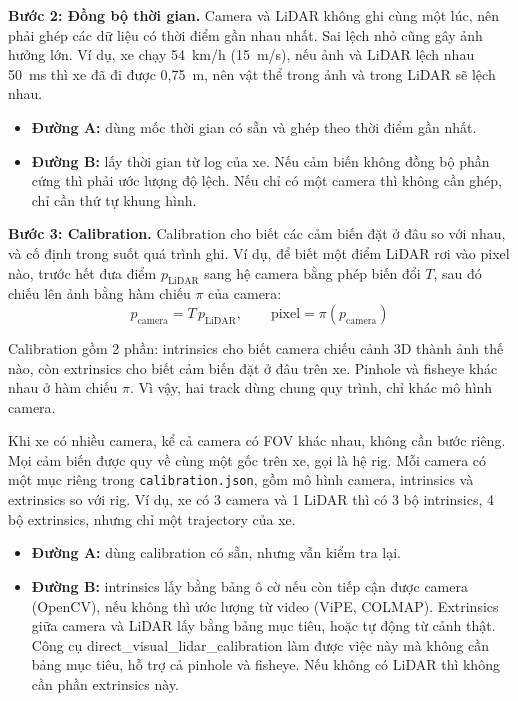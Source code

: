 \textbf{Bước 2: Đồng bộ thời gian.}
Camera và LiDAR không ghi cùng một lúc, nên phải ghép các dữ liệu có thời điểm gần nhau nhất.
Sai lệch nhỏ cũng gây ảnh hưởng lớn.
Ví dụ, xe chạy 54~km/h (15~m/s), nếu ảnh và LiDAR lệch nhau 50~ms thì xe đã đi được 0,75~m, nên vật thể trong ảnh và trong LiDAR sẽ lệch nhau.
\begin{itemize}
  \item \textbf{Đường A:} dùng mốc thời gian có sẵn và ghép theo thời điểm gần nhất.
  \item \textbf{Đường B:} lấy thời gian từ log của xe. Nếu cảm biến không đồng bộ phần cứng thì phải ước lượng độ lệch. Nếu chỉ có một camera thì không cần ghép, chỉ cần thứ tự khung hình.
\end{itemize}

\textbf{Bước 3: Calibration.}
Calibration cho biết các cảm biến đặt ở đâu so với nhau, và cố định trong suốt quá trình ghi.
Ví dụ, để biết một điểm LiDAR rơi vào pixel nào, trước hết đưa điểm $p_{\text{LiDAR}}$ sang hệ camera bằng phép biến đổi $T$, sau đó chiếu lên ảnh bằng hàm chiếu $\pi$ của camera:
\begin{equation}
  p_{\text{camera}} = T \, p_{\text{LiDAR}}, \qquad \text{pixel} = \pi(p_{\text{camera}})
\end{equation}

Calibration gồm 2 phần: intrinsics cho biết camera chiếu cảnh 3D thành ảnh thế nào, còn extrinsics cho biết cảm biến đặt ở đâu trên xe.
Pinhole và fisheye khác nhau ở hàm chiếu $\pi$. Vì vậy, hai track dùng chung quy trình, chỉ khác mô hình camera.

Khi xe có nhiều camera, kể cả camera có FOV khác nhau, không cần bước riêng.
Mọi cảm biến được quy về cùng một gốc trên xe, gọi là hệ rig. Mỗi camera có một mục riêng trong \texttt{calibration.json}, gồm mô hình camera, intrinsics và extrinsics so với rig.
Ví dụ, xe có 3 camera và 1 LiDAR thì có 3 bộ intrinsics, 4 bộ extrinsics, nhưng chỉ một trajectory của xe.

\begin{itemize}
  \item \textbf{Đường A:} dùng calibration có sẵn, nhưng vẫn kiểm tra lại.
  \item \textbf{Đường B:} intrinsics lấy bằng bảng ô cờ nếu còn tiếp cận được camera (OpenCV), nếu không thì ước lượng từ video (ViPE, COLMAP). Extrinsics giữa camera và LiDAR lấy bằng bảng mục tiêu, hoặc tự động từ cảnh thật. Công cụ direct\_visual\_\allowbreak lidar\_\allowbreak calibration làm được việc này mà không cần bảng mục tiêu, hỗ trợ cả pinhole và fisheye. Nếu không có LiDAR thì không cần phần extrinsics này.
\end{itemize}

